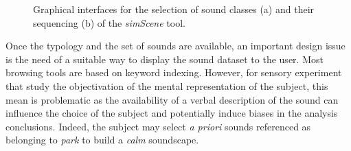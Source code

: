 \documentclass[12pt]{elsarticle}
\newcommand{\myfloatalign}{\centering}
\begin{document}
\begin{figure}[!tp]
		\myfloatalign
         \par
       \caption{Graphical interfaces for the selection of sound classes (a) and their sequencing (b) of the \emph{simScene} tool.}
\end{figure}



Once the typology and the set of sounds are available, an important design issue is the need of a suitable way to display the sound dataset to the user. Most browsing tools are based on keyword indexing. However, for sensory experiment that study the objectivation of the mental representation of the subject, this mean is problematic as the availability of a verbal description of the sound can influence the choice of the subject and potentially induce biases in the analysis conclusions. Indeed, the subject may select \textit{a priori} sounds referenced as belonging to \emph{park} to build a \emph{calm} soundscape.
\end{document}
